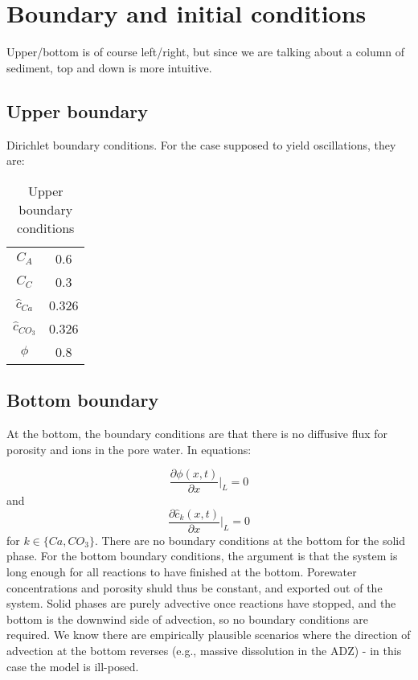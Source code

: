 \documentclass[10pt, letterpaper]{article}
\begin{document}
\section{Boundary and initial conditions}
Upper/bottom is of course left/right, but since we are talking about a column of sediment, top and down is more intuitive.

\subsection{Upper boundary}
Dirichlet boundary conditions. For the case supposed to yield oscillations, they are:

\begin{table}[hbt!]
    \centering
    \begin{tabular}{cc}
         $C_A$& 0.6\\
         $C_C$& 0.3\\
         $\hat{c}_{Ca}$& 0.326\\
         $\hat{c}_{CO_3}$& 0.326\\
         $\phi$& 0.8\\
    \end{tabular}
    \caption{Upper boundary conditions}
\end{table}

\subsection{Bottom boundary}
At the bottom, the boundary conditions are that there is no diffusive flux for porosity and ions in the pore water. In equations:

\begin{equation}
    \frac{\partial \phi(x,t)}{\partial x} \big|_L = 0 \tag{35}
\end{equation}
and 
\begin{equation}
     \frac{\partial \hat c_k (x,t)}{\partial x} \big|_L = 0 \tag{35}
\end{equation}
for $k \in \{ Ca, CO_3\} $. There are no boundary conditions at the bottom for the solid phase. 
For the bottom boundary conditions, the argument is that the system is long enough for all reactions to have finished at the bottom. Porewater concentrations and porosity shuld thus be constant, and exported out of the system. Solid phases are purely advective once reactions have stopped, and the bottom is the downwind side of advection, so no boundary conditions are required. We know there are empirically plausible scenarios where the direction of advection at the bottom reverses (e.g., massive dissolution in the ADZ) - in this case the model is ill-posed.
\end{document}
